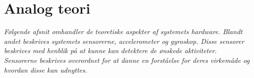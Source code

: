 \section{Analog teori}
\textit{Følgende afsnit omhandler de teoretiske aspekter af systemets hardware. Blandt andet beskrives systemets sensorerne, accelerometer og gyroskop. Disse sensorer beskrives med henblik på at kunne kan detektere de ønskede aktiviteter. Sensorerne beskrives overordnet for at danne en forståelse for deres virkemåde og hvordan disse kan udnyttes.}
